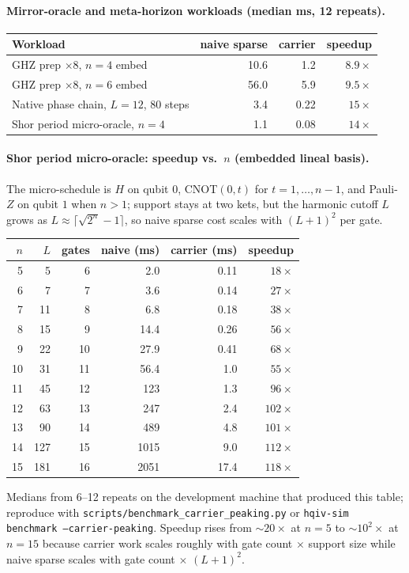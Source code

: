 \documentclass[11pt,a4paper]{article}
\theoremstyle{remark}
\begin{document}
\paragraph{Mirror-oracle and meta-horizon workloads (median ms, 12 repeats).}
\begin{center}\small
\begin{tabular}{|l|r|r|r|}
\hline
Workload & naive sparse & carrier & speedup \\
\hline
GHZ prep $\times 8$, $n=4$ embed & 10.6 & 1.2 & $8.9\times$ \\
GHZ prep $\times 8$, $n=6$ embed & 56.0 & 5.9 & $9.5\times$ \\
Native phase chain, $L=12$, 80 steps & 3.4 & 0.22 & $15\times$ \\
Shor period micro-oracle, $n=4$ & 1.1 & 0.08 & $14\times$ \\
\hline
\end{tabular}
\end{center}

\paragraph{Shor period micro-oracle: speedup vs.\ $n$ (embedded lineal basis).}
The micro-schedule is $H$ on qubit $0$, CNOT$(0,t)$ for $t=1,\ldots,n-1$, and Pauli-$Z$ on qubit $1$ when $n>1$; support stays at two kets, but the harmonic cutoff $L$ grows as $L\approx\lceil\sqrt{2^n}-1\rceil$, so naive sparse cost scales with $(L+1)^2$ per gate.
\begin{center}\small
\begin{tabular}{|r|r|r|r|r|r|}
\hline
$n$ & $L$ & gates & naive (ms) & carrier (ms) & speedup \\
\hline
5  & 5   & 6  & 2.0  & 0.11 & $18\times$ \\
6  & 7   & 7  & 3.6  & 0.14 & $27\times$ \\
7  & 11  & 8  & 6.8  & 0.18 & $38\times$ \\
8  & 15  & 9  & 14.4 & 0.26 & $56\times$ \\
9  & 22  & 10 & 27.9 & 0.41 & $68\times$ \\
10 & 31  & 11 & 56.4 & 1.0  & $55\times$ \\
11 & 45  & 12 & 123  & 1.3  & $96\times$ \\
12 & 63  & 13 & 247  & 2.4  & $102\times$ \\
13 & 90  & 14 & 489  & 4.8  & $101\times$ \\
14 & 127 & 15 & 1015 & 9.0  & $112\times$ \\
15 & 181 & 16 & 2051 & 17.4 & $118\times$ \\
\hline
\end{tabular}
\end{center}
\noindent Medians from 6--12 repeats on the development machine that produced this table; reproduce with \texttt{scripts/benchmark\_carrier\_peaking.py} or \texttt{hqiv-sim benchmark --carrier-peaking}.
Speedup rises from $\sim 20\times$ at $n=5$ to $\sim 10^2\times$ at $n=15$ because carrier work scales roughly with gate count $\times$ support size while naive sparse scales with gate count $\times$ $(L+1)^2$.
\end{document}
